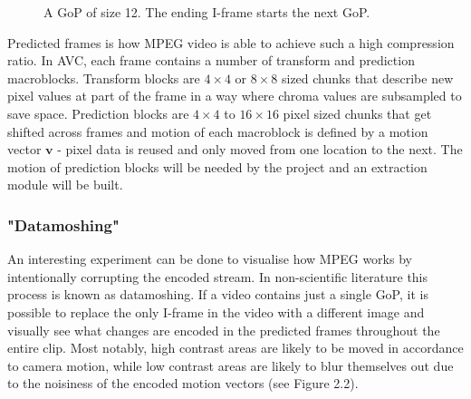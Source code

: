 \documentclass[11pt,english]{report}
\newcommand*{\angleframe}[7]{%
\begin{scope}[xshift  =#4, yshift = #5,
			every node/.append style = {yslant = #7},
			yslant = #7,
			local bounding box = #2]
\node[#1] at (#6,#6) {};
\node[label, yslant = -#7, above right=9em and -0.75em of #2.south east](#2-label) {#3};
\end{scope}
}
\begin{document}
\begin{figure}[!ht]
	\centering
	\caption{\centering A GoP of size 12. The ending I-frame starts the next GoP.}
\end{figure}

Predicted frames is how MPEG video is able to achieve such a high compression ratio. In AVC, each frame contains a number of transform and prediction macroblocks. Transform blocks are $4 \times 4$ or $8 \times 8$ sized chunks that describe new pixel values at part of the frame in a way where chroma values are subsampled to save space. Prediction blocks are $4 \times 4$ to $16 \times 16$ pixel sized chunks that get shifted across frames and motion of each macroblock is defined by a motion vector $\mathbf{v}$ - pixel data is reused and only moved from one location to the next. The motion of prediction blocks will be needed by the project and an extraction module will be built.

\subsubsection{"Datamoshing"}

An interesting experiment can be done to visualise how MPEG works by intentionally corrupting the encoded stream. In non-scientific literature this process is known as datamoshing. If a video contains just a single GoP, it is possible to replace the only I-frame in the video with a different image and visually see what changes are encoded in the predicted frames throughout the entire clip. Most notably, high contrast areas are likely to be moved in accordance to camera motion, while low contrast areas are likely to blur themselves out due to the noisiness of the encoded motion vectors (see Figure 2.2).
\end{document}
